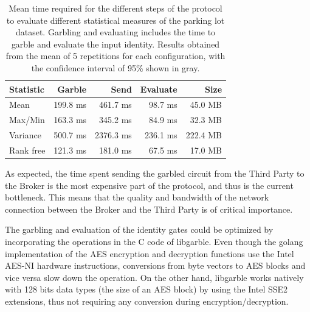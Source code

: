 
\begin{table}
    \begin{tabular}{l*{3}{r}r}
    \textbf{Statistic}  & \textbf{Garble} & \textbf{Send} & \textbf{Evaluate} & \textbf{Size} \\
    \hline
    Mean       & 199.8 ms & 461.7 ms & 98.7  ms & 45.0 MB \\
    Max/Min    & 163.3 ms & 345.2 ms & 84.9  ms & 32.3 MB \\
    Variance   & 500.7 ms & 2376.3 ms & 236.1 ms & 222.4 MB \\
    \hline
    Rank free  & 121.3 ms & 181.0 ms & 67.5 ms & 17.0 MB \\
    \end{tabular}
    \caption{Mean time required for the different steps of the protocol to
      evaluate different statistical measures of the parking lot dataset.
      Garbling and evaluating includes the time to garble and evaluate the
      input identity.  Results obtained from the mean of 5 repetitions for each
      configuration, with the confidence interval of 95\% shown in gray.}
    \label{stats-times}
\end{table}




As expected, the time spent sending the garbled circuit from the Third Party to
the Broker is the most expensive part of the protocol, and thus is the current
bottleneck.  This means that the quality and bandwidth of the network
connection between the Broker and the Third Party is of critical importance.

The garbling and evaluation of the identity gates could be optimized by
incorporating the operations in the C code of libgarble.  Even though the
golang implementation of the AES encryption and decryption functions use the
Intel AES-NI hardware instructions, conversions from byte vectors to AES blocks
and vice versa slow down the operation.  On the other hand, libgarble works
natively with 128 bits data types (the size of an AES block) by using the Intel
SSE2 extensions, thus not requiring any conversion during
encryption/decryption.

